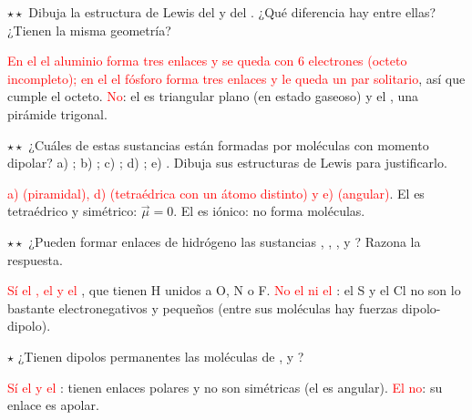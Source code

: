 \begin{exercise}
    \(\star\star\) Dibuja la estructura de Lewis del  y del . ¿Qué diferencia hay entre ellas? ¿Tienen la
    misma geometría?
    \begin{solu}
        \textcolor{red}{En el  el aluminio forma tres enlaces y se queda con 6 electrones (octeto incompleto); en el
         el fósforo forma tres enlaces y le queda un par solitario}, así que cumple el octeto.
        \textcolor{red}{No}: el  es triangular plano (en estado gaseoso) y el , una pirámide trigonal.
    \end{solu}
\end{exercise}

\begin{exercise}
    \(\star\star\) ¿Cuáles de estas sustancias están formadas por moléculas con momento dipolar? a) ; b) ;
    c) ; d) ; e) . Dibuja sus estructuras de Lewis para justificarlo.
    \begin{solu}
        \textcolor{red}{a)  (piramidal), d)  (tetraédrica con un átomo distinto) y e)  (angular)}. El
         es tetraédrico y simétrico: \(\vec{\mu} = 0\). El  es iónico: no forma moléculas.
    \end{solu}
\end{exercise}

\begin{exercise}
    \(\star\star\) ¿Pueden formar enlaces de hidrógeno las sustancias , , ,  y ? Razona
    la respuesta.
    \begin{solu}
        \textcolor{red}{Sí el , el  y el }, que tienen H unidos a O, N o F. \textcolor{red}{No el 
        ni el }: el S y el Cl no son lo bastante electronegativos y pequeños (entre sus moléculas hay fuerzas
        dipolo-dipolo).
    \end{solu}
\end{exercise}

\begin{exercise}
    \(\star\) ¿Tienen dipolos permanentes las moléculas de ,  y ?
    \begin{solu}
        \textcolor{red}{Sí el  y el }: tienen enlaces polares y no son simétricas (el  es angular).
        \textcolor{red}{El  no}: su enlace es apolar.
    \end{solu}
\end{exercise}

